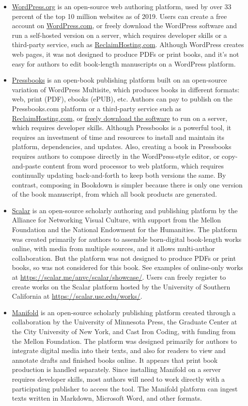 \documentclass[
  english,
]{book}
\begin{document}
\begin{itemize}
\item
  \href{https://wordpress.org}{WordPress.org} is an open-source web authoring platform, used by over 33 percent of the top 10 million websites as of 2019. Users can create a free account on \href{https://wordpress.com}{WordPress.com}, or freely download the WordPress software and run a self-hosted version on a server, which requires developer skills or a third-party service, such as \href{https://reclaimhosting.com}{ReclaimHosting.com}. Although WordPress creates web pages, it was not designed to produce PDFs or print books, and it's not easy for authors to edit book-length manuscripts on a WordPress platform.
\item
  \href{https://pressbooks.com}{Pressbooks} is an open-book publishing platform built on an open-source variation of WordPress Multisite, which produces books in different formats: web, print (PDF), ebooks (ePUB), etc. Authors can pay to publish on the Pressbooks.com platform or a third-party service such as \href{https://reclaimhosting.com}{ReclaimHosting.com}, or \href{https://github.com/pressbooks}{freely download the software} to run on a server, which requires developer skills. Although Pressbooks is a powerful tool, it requires an investment of time and resources to install and maintain its platform, dependencies, and updates. Also, creating a book in Pressbooks requires authors to compose directly in the WordPress-style editor, or copy-and-paste content from word processor to web platform, which requires continually updating back-and-forth to keep both versions the same. By contrast, composing in Bookdown is simpler because there is only one version of the book manuscript, from which all book products are generated.
\item
  \href{https://scalar.me/}{Scalar} is an open-source scholarly authoring and publishing platform by the Alliance for Networking Visual Culture, with support from the Mellon Foundation and the National Endowment for the Humanities. The platform was created primarily for authors to assemble born-digital book-length works online, with media from multiple sources, and it allows multi-author collaboration. But the platform was not designed to produce PDFs or print books, so was not considered for this book. See examples of online-only works at \url{https://scalar.me/anvc/scalar/showcase/}. Users can freely register to create works on the Scalar platform hosted by the University of Southern California at \url{https://scalar.usc.edu/works/}.
\item
  \href{https://manifoldapp.org}{Manifold} is an open-source scholarly publishing platform created through a collaboration by the University of Minnesota Press, the Graduate Center at the City University of New York, and Cast Iron Coding, with funding from the Mellon Foundation. The platform was designed primarily for authors to integrate digital media into their texts, and also for readers to view and annotate drafts and finished books online. It appears that print book production is handled separately. Since installing Manifold on a server requires developer skills, most authors will need to work directly with a participating publisher to access the tool. The Manifold platform can ingest texts written in Markdown, Microsoft Word, and other formats.

\end{itemize}
\end{document}
